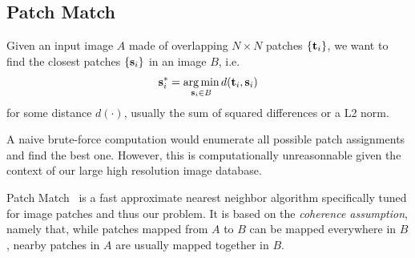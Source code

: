 
\subsection{Patch Match}

Given an input image $A$ made of overlapping $N\times N$ patches $\{\mathbf{t}_i\}$, we want to find the closest patches $\{\mathbf{s}_i\}$ in an image $B$, i.e.
\begin{equation}
	\mathbf{s}_i^{*} = \operatorname*{arg\,min}_{\mathbf{s}_i \in B} d(\mathbf{t}_i, \mathbf{s}_i)
\end{equation}
for some distance $d(\cdot)$, usually the sum of squared differences or a L2 norm.

A naive brute-force computation would enumerate all possible patch assignments and find the best one.
However, this is computationally unreasonnable given the context of our large high resolution image database.

Patch Match~\cite{Barnes09} is a fast approximate nearest neighbor algorithm specifically tuned for image patches and thus our problem.
It is based on the \emph{coherence assumption}, namely that, while patches mapped from $A$ to $B$ can be mapped everywhere in $B$, nearby patches in $A$ are usually mapped together in $B$.


